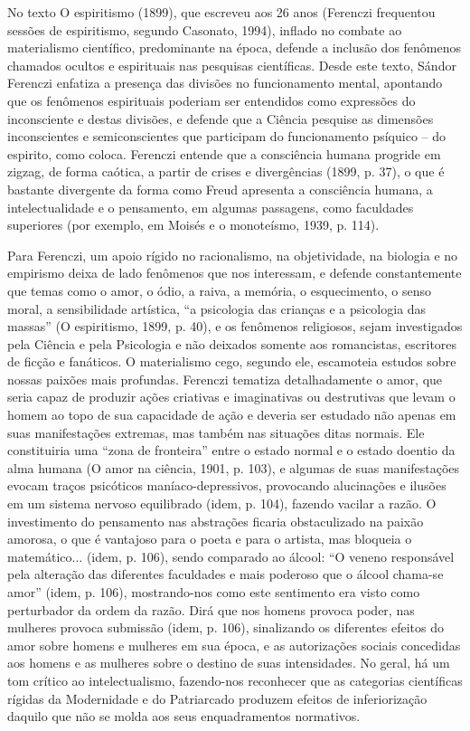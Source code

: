 No texto O espiritismo (1899), que escreveu aos 26 anos (Ferenczi
frequentou sessões de espiritismo, segundo Casonato, 1994), inflado no
combate ao materialismo científico, predominante na época, defende a
inclusão dos fenômenos chamados ocultos e espirituais nas pesquisas
científicas. Desde este texto, Sándor Ferenczi enfatiza a presença das
divisões no funcionamento mental, apontando que os fenômenos espirituais
poderiam ser entendidos como expressões do inconsciente e destas
divisões, e defende que a Ciência pesquise as dimensões inconscientes e
semiconscientes que participam do funcionamento psíquico -- do espirito,
como coloca. Ferenczi entende que a consciência humana progride em
zigzag, de forma caótica, a partir de crises e divergências (1899, p.
37), o que é bastante divergente da forma como Freud apresenta a
consciência humana, a intelectualidade e o pensamento, em algumas
passagens, como faculdades superiores (por exemplo, em Moisés e o
monoteísmo, 1939, p. 114).

Para Ferenczi, um apoio rígido no racionalismo, na objetividade, na
biologia e no empirismo deixa de lado fenômenos que nos interessam, e
defende constantemente que temas como o amor, o ódio, a raiva, a
memória, o esquecimento, o senso moral, a sensibilidade artística, ``a
psicologia das crianças e a psicologia das massas'' (O espiritismo,
1899, p. 40), e os fenômenos religiosos, sejam investigados pela Ciência
e pela Psicologia e não deixados somente aos romancistas, escritores de
ficção e fanáticos. O materialismo cego, segundo ele, escamoteia estudos
sobre nossas paixões mais profundas. Ferenczi tematiza detalhadamente o
amor, que seria capaz de produzir ações criativas e imaginativas ou
destrutivas que levam o homem ao topo de sua capacidade de ação e
deveria ser estudado não apenas em suas manifestações extremas, mas
também nas situações ditas normais. Ele constituiria uma ``zona de
fronteira'' entre o estado normal e o estado doentio da alma humana (O
amor na ciência, 1901, p. 103), e algumas de suas manifestações evocam
traços psicóticos maníaco-depressivos, provocando alucinações e ilusões
em um sistema nervoso equilibrado (idem, p. 104), fazendo vacilar a
razão. O investimento do pensamento nas abstrações ficaria obstaculizado
na paixão amorosa, o que é vantajoso para o poeta e para o artista, mas
bloqueia o matemático... (idem, p. 106), sendo comparado ao álcool: ``O
veneno responsável pela alteração das diferentes faculdades e mais
poderoso que o álcool chama-se amor'' (idem, p. 106), mostrando-nos como
este sentimento era visto como perturbador da ordem da razão. Dirá que
nos homens provoca poder, nas mulheres provoca submissão (idem, p. 106),
sinalizando os diferentes efeitos do amor sobre homens e mulheres em sua
época, e as autorizações sociais concedidas aos homens e as mulheres
sobre o destino de suas intensidades. No geral, há um tom crítico ao
intelectualismo, fazendo-nos reconhecer que as categorias científicas
rígidas da Modernidade e do Patriarcado produzem efeitos de
inferiorização daquilo que não se molda aos seus enquadramentos
normativos.

